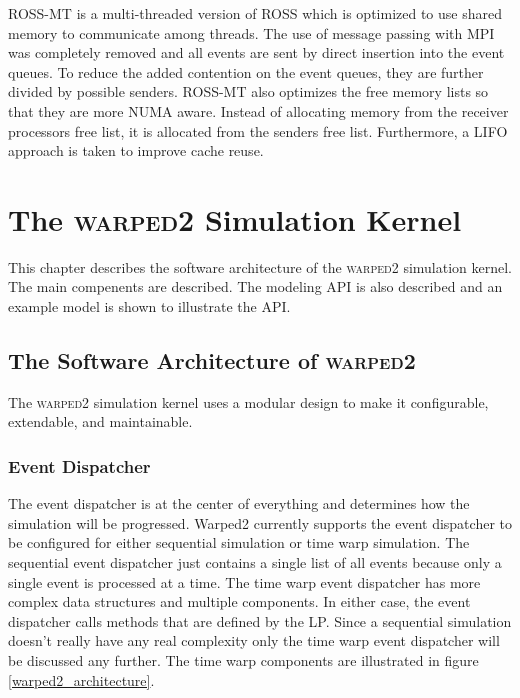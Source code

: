 \documentclass[11pt]{book}
\begin{document}
ROSS-MT\cite{jagtap-12} is a multi-threaded version of ROSS which is optimized to use shared
memory to communicate among threads. The use of message passing with MPI was completely
removed and all events are sent by direct insertion into the event queues. To reduce the
added contention on the event queues, they are further divided by possible senders. ROSS-MT
also optimizes the free memory lists so that they are more NUMA aware. Instead of allocating
memory from the receiver processors free list, it is allocated from the senders free list.
Furthermore, a LIFO approach is taken to improve cache reuse.



\chapter{The \textsc{warped2} Simulation Kernel}\label{warped2_overview}

This chapter describes the software architecture of the \textsc{warped2} simulation kernel.
The main compenents are described. The modeling API is also described and an example model
is shown to illustrate the API.

\section{The Software Architecture of \textsc{warped2}}

The \textsc{warped2} simulation kernel uses a modular design to make it configurable,
extendable, and maintainable.

\subsection{Event Dispatcher}

The event dispatcher is at the center of everything and determines how the simulation will
be progressed. Warped2 currently supports the event dispatcher to be configured for either
sequential simulation or time warp simulation. The sequential event dispatcher just contains
a single list of all events because only a single event is processed at a time. The time warp
event dispatcher has more complex data structures and multiple components. In either case,
the event dispatcher calls methods that are defined by the LP. Since a sequential simulation
doesn't really have any real complexity only the time warp event dispatcher will be discussed
any further. The time warp components are illustrated in figure \ref{warped2_architecture}.
\end{document}

